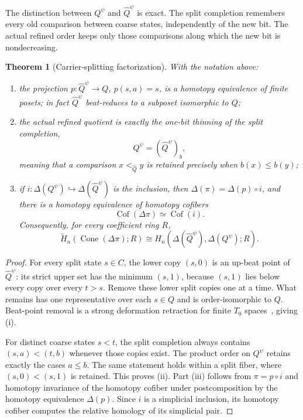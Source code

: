 \documentclass[11pt]{article}
\newtheorem{theorem}{Theorem}[section]
\newcommand{\Cone}{\operatorname{Cone}}
\begin{document}
The distinction between $Q^\psi$ and $\widehat Q^\psi$ is exact.  The split
completion remembers every old comparison between coarse states, independently
of the new bit.  The actual refined order keeps only those comparisons along
which the new bit is nondecreasing.

\begin{theorem}[Carrier-splitting factorization]\label{thm:split-factorization}
With the notation above:
\begin{enumerate}[label=(\roman*)]
\item the projection $p:\widehat Q^\psi\to Q$, $p(s,a)=s$, is a homotopy
  equivalence of finite posets; in fact $\widehat Q^\psi$ beat-reduces to a
  subposet isomorphic to $Q$;
\item the actual refined quotient is exactly the one-bit thinning of the split
  completion,
  \[
    Q^\psi=(\widehat Q^\psi)_b,
  \]
  meaning that a comparison $x<_{\widehat Q}y$ is retained precisely when
  $b(x)\leq b(y)$;
\item if $i:\Delta(Q^\psi)\hookrightarrow\Delta(\widehat Q^\psi)$ is the
  inclusion, then $\Delta(\pi)=\Delta(p)\circ i$, and there is a homotopy
  equivalence of homotopy cofibers
  \[
  \operatorname{Cof}(\Delta\pi)\simeq
  \operatorname{Cof}(i).
  \]
  Consequently, for every coefficient ring $R$,
  \[
  \widetilde H_n\!\left(\Cone(\Delta\pi);R\right)
  \cong
  H_n\!\left(\Delta(\widehat Q^\psi),\Delta(Q^\psi);R\right).
  \]
\end{enumerate}
\end{theorem}

\begin{proof}
For every split state $s\in C$, the lower copy $(s,0)$ is an up-beat point of
$\widehat Q^\psi$: its strict upper set has the minimum $(s,1)$, because
$(s,1)$ lies below every copy over every $t>s$.  Remove these lower split
copies one at a time.  What remains has one representative over each $s\in Q$
and is order-isomorphic to $Q$.  Beat-point removal is a strong deformation
retraction for finite $T_0$ spaces~\cite{Stong1966}, giving (i).

For distinct coarse states $s<t$, the split completion always contains
$(s,a)<(t,b)$ whenever those copies exist.  The product order on $Q^\psi$
retains exactly the cases $a\leq b$.  The same statement holds within a split
fiber, where $(s,0)<(s,1)$ is retained.  This proves (ii).  Part (iii) follows
from $\pi=p\circ i$ and homotopy invariance of the homotopy cofiber under
postcomposition by the homotopy equivalence $\Delta(p)$.  Since $i$ is a
simplicial inclusion, its homotopy cofiber computes the relative homology of
its simplicial pair.
\end{proof}
\end{document}
